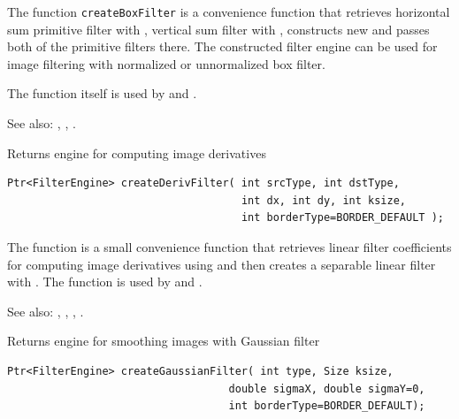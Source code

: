 The function \texttt{createBoxFilter} is a convenience function that retrieves horizontal sum primitive filter with , vertical sum filter with , constructs new  and passes both of the primitive filters there. The constructed filter engine can be used for image filtering with normalized or unnormalized box filter.

The function itself is used by  and .

See also: , , .

\label{createDerivFilter}
Returns engine for computing image derivatives 

\begin{lstlisting}
Ptr<FilterEngine> createDerivFilter( int srcType, int dstType,
                                     int dx, int dy, int ksize,
                                     int borderType=BORDER_DEFAULT );
\end{lstlisting}
\begin{description}
\end{description}

The function  is a small convenience function that retrieves linear filter coefficients for computing image derivatives using  and then creates a separable linear filter with . The function is used by  and .

See also: , , , .

\label{createGaussianFilter}
Returns engine for smoothing images with Gaussian filter

\begin{lstlisting}
Ptr<FilterEngine> createGaussianFilter( int type, Size ksize,
                                   double sigmaX, double sigmaY=0,
                                   int borderType=BORDER_DEFAULT);
\end{lstlisting}
\begin{description}
\end{description}

